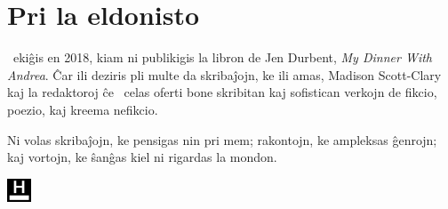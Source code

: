 \chapter*{Pri la eldonisto}

\vspace{1ex}

\Publisher\ ekiĝis en 2018, kiam ni publikigis la libron de Jen Durbent, \emph{My Dinner With Andrea}. Ĉar ili deziris pli multe da skribaĵojn, ke ili amas, Madison Scott-Clary kaj la redaktoroj ĉe \ShortPublisher\ celas oferti bone skribitan kaj sofistican verkojn de fikcio, poezio, kaj kreema nefikcio.

Ni volas skribaĵojn, ke pensigas nin pri mem; rakontojn, ke ampleksas ĝenrojn; kaj vortojn, ke ŝanĝas kiel ni rigardas la mondon.

\begin{center}
  \noindent\includegraphics[height=20pt]{assets/icon}
\end{center}
